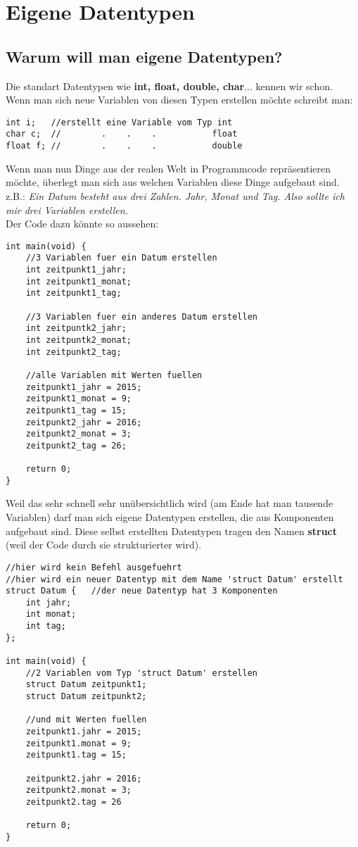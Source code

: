 \documentclass[c_worksheet.tex]{subfiles}
\begin{document}
  
\chapter{Eigene Datentypen}

\section{Warum will man eigene Datentypen?}

Die standart Datentypen wie \textbf{int, float, double, char}... kennen wir schon. Wenn man sich neue Variablen von diesen Typen erstellen möchte schreibt man:
\begin{lstlisting}
int i;   //erstellt eine Variable vom Typ int
char c;  //        .    .    .           float
float f; //        .    .    .           double
\end{lstlisting}

Wenn man nun Dinge aus der realen Welt in Programmcode repräsentieren möchte, überlegt man sich aus welchen Variablen diese Dinge aufgebaut sind.\\
z.B.: \textit{Ein Datum besteht aus drei Zahlen. Jahr, Monat und Tag. Also sollte ich mir drei Variablen erstellen.} \\

Der Code dazu könnte so aussehen:
\begin{lstlisting}
int main(void) {
    //3 Variablen fuer ein Datum erstellen
    int zeitpunkt1_jahr;
    int zeitpunkt1_monat;
    int zeitpunkt1_tag;

    //3 Variablen fuer ein anderes Datum erstellen
    int zeitpuntk2_jahr;
    int zeitpuntk2_monat;
    int zeitpunkt2_tag;

    //alle Variablen mit Werten fuellen
    zeitpunkt1_jahr = 2015;
    zeitpunkt1_monat = 9;
    zeitpunkt1_tag = 15;
    zeitpunkt2_jahr = 2016;
    zeitpunkt2_monat = 3;
    zeitpunkt2_tag = 26;

    return 0;
}
\end{lstlisting}

Weil das sehr schnell sehr unübersichtlich wird (am Ende hat man tausende Variablen) darf man sich eigene Datentypen erstellen, die aus Komponenten aufgebaut sind.
Diese selbst erstellten Datentypen tragen den Namen \textbf{struct} (weil der Code durch sie strukturierter wird).

\begin{lstlisting}
//hier wird kein Befehl ausgefuehrt
//hier wird ein neuer Datentyp mit dem Name 'struct Datum' erstellt
struct Datum {   //der neue Datentyp hat 3 Komponenten
    int jahr;
    int monat;
    int tag;
};

int main(void) {
    //2 Variablen vom Typ 'struct Datum' erstellen
    struct Datum zeitpunkt1;
    struct Datum zeitpunkt2;

    //und mit Werten fuellen
    zeitpunkt1.jahr = 2015;
    zeitpunkt1.monat = 9;
    zeitpunkt1.tag = 15;

    zeitpunkt2.jahr = 2016;
    zeitpunkt2.monat = 3;
    zeitpunkt2.tag = 26

    return 0;
}
\end{lstlisting}
\end{document}

